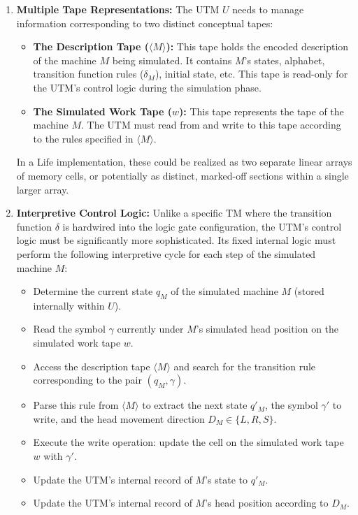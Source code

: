 \documentclass{article}
\theoremstyle{definition}
\theoremstyle{plain}
\theoremstyle{plain}
\begin{document}
\begin{enumerate}
  \item \textbf{Multiple Tape Representations:} The UTM $U$ needs to manage information corresponding to two distinct conceptual tapes:
    \begin{itemize}
      \item \textbf{The Description Tape ($\langle M \rangle$):} This tape holds the encoded description of the machine $M$ being simulated. It contains $M$'s states, alphabet, transition function rules ($\delta_M$), initial state, etc. This tape is read-only for the UTM's control logic during the simulation phase.
      \item \textbf{The Simulated Work Tape ($w$):} This tape represents the tape of the machine $M$. The UTM must read from and write to this tape according to the rules specified in $\langle M \rangle$.
    \end{itemize}
    In a Life implementation, these could be realized as two separate linear arrays of memory cells, or potentially as distinct, marked-off sections within a single larger array.

  \item \textbf{Interpretive Control Logic:} Unlike a specific TM where the transition function $\delta$ is hardwired into the logic gate configuration, the UTM's control logic must be significantly more sophisticated. Its fixed internal logic must perform the following interpretive cycle for each step of the simulated machine $M$:
    \begin{itemize}
      \item Determine the current state $q_M$ of the simulated machine $M$ (stored internally within $U$).
      \item Read the symbol $\gamma$ currently under $M$'s simulated head position on the simulated work tape $w$.
      \item Access the description tape $\langle M \rangle$ and search for the transition rule corresponding to the pair $(q_M, \gamma)$.
      \item Parse this rule from $\langle M \rangle$ to extract the next state $q'_M$, the symbol $\gamma'$ to write, and the head movement direction $D_M \in \{L, R, S\}$.
      \item Execute the write operation: update the cell on the simulated work tape $w$ with $\gamma'$.
      \item Update the UTM's internal record of $M$'s state to $q'_M$.
      \item Update the UTM's internal record of $M$'s head position according to $D_M$.
    \end{itemize}
\end{enumerate}
\end{document}

